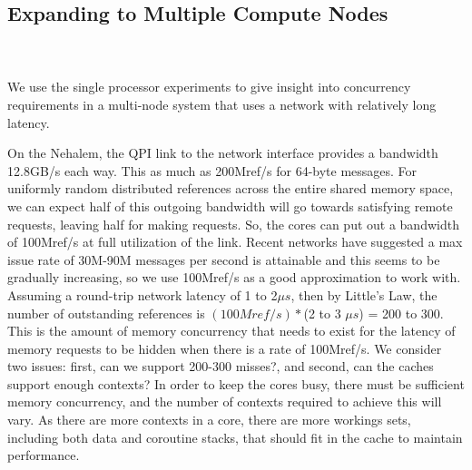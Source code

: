 \subsection{Expanding to Multiple Compute Nodes}
	\\
	\\
	We use the single processor experiments to give insight into concurrency requirements in a multi-node system that uses a network with relatively long latency. 
	
	On the Nehalem, the QPI link to the network interface provides a bandwidth 12.8GB/s each way. This as much as 200Mref/s for 64-byte messages. For uniformly random distributed references across the entire shared memory space, we can expect half of this outgoing bandwidth will go towards satisfying remote requests, leaving half for making requests.  So, the cores can put out a bandwidth of 100Mref/s at full utilization of the link. Recent networks have suggested a max issue rate of 30M-90M messages per second is attainable  and this seems to be gradually increasing, so we use 100Mref/s as a good approximation to work with. Assuming a round-trip network latency of 1 to 2$\mu s$, then by Little's Law, the number of outstanding references is $(100Mref/s) * $(2 to 3 $\mu s$) = 200 to 300. This is the amount of memory concurrency that needs to exist for the latency of memory requests to be hidden when there is a rate of 100Mref/s.
We consider two issues: first, can we support 200-300 misses?, and second, can the caches support enough contexts? 
 In order to keep the cores busy, there must be sufficient memory concurrency, and the number of contexts required to achieve this will vary. As there are more contexts in a core, there are more workings sets, including both data and coroutine stacks, that should fit in the cache to maintain performance.
	
